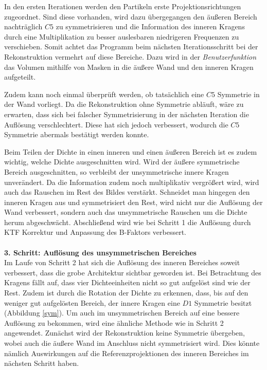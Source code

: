 In den ersten Iterationen werden den Partikeln erste Projektionsrichtungen zugeordnet.
Sind diese vorhanden, wird dazu übergegangen den äußeren Bereich nachträglich $C5$ zu symmetrisieren und die Information des inneren Kragens durch eine Multiplikation zu besser auslesbaren niedrigeren Frequenzen zu verschieben.
Somit achtet das Programm beim nächsten Iterationsschritt bei der Rekonstruktion vermehrt auf diese Bereiche.
Dazu wird in der \textit{Benutzerfunktion} das Volumen mithilfe von Masken in die äußere Wand und den inneren Kragen aufgeteilt.

Zudem kann noch einmal überprüft werden, ob tatsächlich eine $C5$ Symmetrie in der Wand vorliegt.
Da die Rekonstruktion ohne Symmetrie abläuft, wäre zu erwarten, dass sich bei falscher Symmetrisierung in der nächsten Iteration die Auflösung verschlechtert.
Diese hat sich jedoch verbessert, wodurch die $C5$ Symmetrie abermals bestätigt werden konnte.

Beim Teilen der Dichte in einen inneren und einen äußeren Bereich ist es zudem wichtig, welche Dichte ausgeschnitten wird.
Wird der äußere symmetrische Bereich ausgeschnitten, so verbleibt der unsymmetrische innere Kragen unverändert.
Da die Information zudem noch multiplikativ vergrößert wird, wird auch das Rauschen im Rest des Bildes verstärkt.
Schneidet man hingegen den inneren Kragen aus und symmetrisiert den Rest, wird nicht nur die Auflösung der Wand verbessert, sondern auch das unsymmetrische Rauschen um die Dichte herum abgeschwächt.
Abschließend wird wie bei Schritt 1 die Auflösung durch KTF Korrektur und Anpassung des B-Faktors verbessert.
\\
\\
\textbf{3. Schritt: Auflösung des unsymmetrischen Bereiches}\\
Im Laufe von Schritt 2 hat sich die Auflösung des inneren Bereiches soweit verbessert, dass die grobe Architektur sichtbar geworden ist.
Bei Betrachtung des Kragens fällt auf, dass vier Dichteeinheiten nicht so gut aufgelöst sind wie der Rest.
Zudem ist durch die Rotation der Dichte zu erkennen, dass, bis auf den weniger gut aufgelösten Bereich, der innere Kragen eine $D1$ Symmetrie besitzt (Abbildung \ref{sym}).
Um auch im unsymmetrischen Bereich auf eine bessere Auflösung zu bekommen, wird eine ähnliche Methode wie in Schritt 2 angewendet.
Zunächst wird der Rekonstruktion keine Symmetrie übergeben, wobei auch die äußere Wand im Anschluss nicht symmetrisiert wird.
Dies könnte nämlich Auswirkungen auf die Referenzprojektionen des inneren Bereiches im nächsten Schritt haben.

